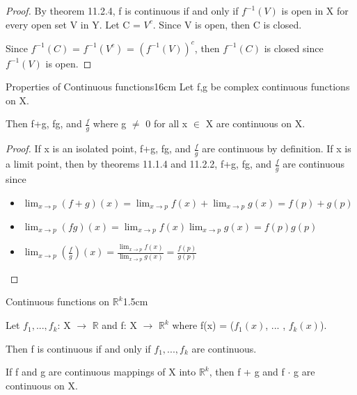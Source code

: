    \begin{proof}
        By {\color{red} theorem 11.2.4}, f is continuous
        if and only if $f^{-1}(V)$ is open in X for every open set V in Y.
        Let C = $V^c$.
        Since V is open, then C is closed.

        Since $f^{-1}(C)$
        = $f^{-1}(V^c)$
        = $(f^{-1}(V))^c$,
        then $f^{-1}(C)$ is closed since $f^{-1}(V)$ is open.
    \end{proof}

    \vspace{0.5cm}



    \begin{wtheorem}{Properties of Continuous functions}{16cm}
        Let f,g be complex continuous functions on X.

        Then f+g, fg, and $\frac{f}{g}$ where g $\not =$ 0 for all x $\in$ X
        are continuous on X.
    \end{wtheorem}

    \begin{proof}
        If x is an isolated point, f+g, fg, and $\frac{f}{g}$
        are continuous by definition.
        If x is a limit point, then by {\color{red} theorems 11.1.4 and 11.2.2},
        f+g, fg, and $\frac{f}{g}$ are continuous since

        \begin{itemize}[leftmargin=1cm, itemsep=0.1cm]
            \item $\lim_{x \rightarrow p} (f+g)(x)
                = \lim_{x \rightarrow p} f(x) + \lim_{x \rightarrow p} g(x)
                = f(p) + g(p)$
            \item $\lim_{x \rightarrow p} (fg)(x)
                = \lim_{x \rightarrow p} f(x) \lim_{x \rightarrow p} g(x)
                = f(p) g(p)$
            \item $\lim_{x \rightarrow p} (\frac{f}{g})(x)
                = \frac{\lim_{x \rightarrow p} f(x)}{\lim_{x \rightarrow p} g(x)}
                = \frac{f(p)}{g(p)}$
        \end{itemize}
    \end{proof}

    \vspace{0.5cm}



    \begin{ltheorem}{Continuous functions on $\mathbb{R}^k$}{1.5cm}
        \item Let $f_1,...,f_k$: X $\rightarrow$ $\mathbb{R}$ and
            f: X $\rightarrow$ $\mathbb{R}^k$ where
            f(x) = ($f_1(x)$, ... , $f_k(x)$).

            Then f is continuous if and only if $f_1,...,f_k$ are continuous.

        \item If f and g are continuous mappings of X into $\mathbb{R}^k$,
            then f + g and f $\cdot$ g are continuous on X.
    \end{ltheorem}

